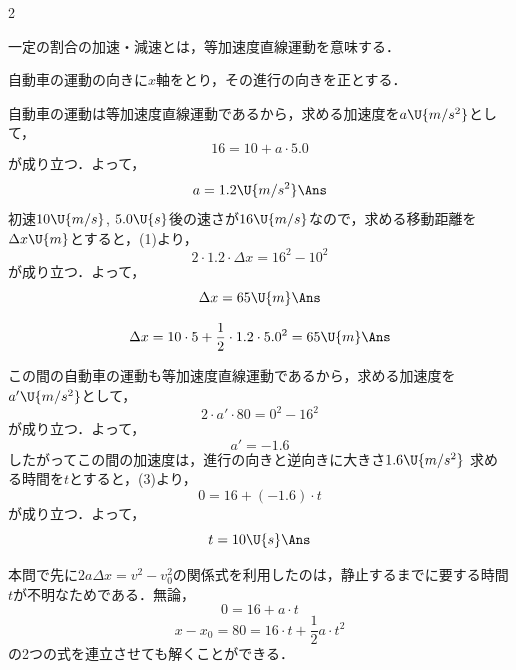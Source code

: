 \begin{multicols}{2}
\begin{sisin}
一定の割合の加速・減速とは，等加速度直線運動を意味する．
\end{sisin}
\par
\hspace{1zw}自動車の運動の向きに$x$軸をとり，その進行の向きを正とする．
\begin{komon}
 自動車の運動は等加速度直線運動であるから，求める加速度を$a\U{m/s^2}$として，
       \[16=10+a\cdot 5.0\]
       が成り立つ．よって，
       \[a=1.2\U{m/s^2}\Ans\]
 初速$10\U{m/s}$, $5.0\U{s}$後の速さが$16\U{m/s}$なので，求める移動距離を$\Delta x\U{m}$とすると，(1)より，
       \[2\cdot 1.2\cdot\Delta x=16^2-10^2\]
       が成り立つ．よって，
       \[\Delta x=65\U{m}\Ans\]
\end{komon}
\begin{bekkai}
\[\Delta x=10\cdot 5+\frac{1}{2}\cdot 1.2\cdot 5.0^2=65\U{m}\Ans\]
\end{bekkai}
\begin{komon}
 この間の自動車の運動も等加速度直線運動であるから，求める加速度を$a'\U{m/s^2}$として，
       \[2\cdot a'\cdot 80=0^2-16^2\]
       が成り立つ．よって，
       \[a'=-1.6\]
       したがってこの間の加速度は，進行の向きと逆向きに大きさ$1.6\U{m/s^2}$\Ans
{} 求める時間を$t$とすると，(3)より，
       \[0=16+(-1.6)\cdot t\]
       が成り立つ．よって，
       \[t=10\U{s}\Ans\]
\end{komon}
\begin{chuu}
本問で先に$2a\Delta x=v^2-v_0^2$の関係式を利用したのは，静止するまでに要する時間$t$が不明なためである．無論，
\[0=16+a\cdot t\]
\[x-x_0=80=16\cdot t+\frac{1}{2}a\cdot t^2\]
の2つの式を連立させても解くことができる．
\end{chuu}


\end{multicols}
